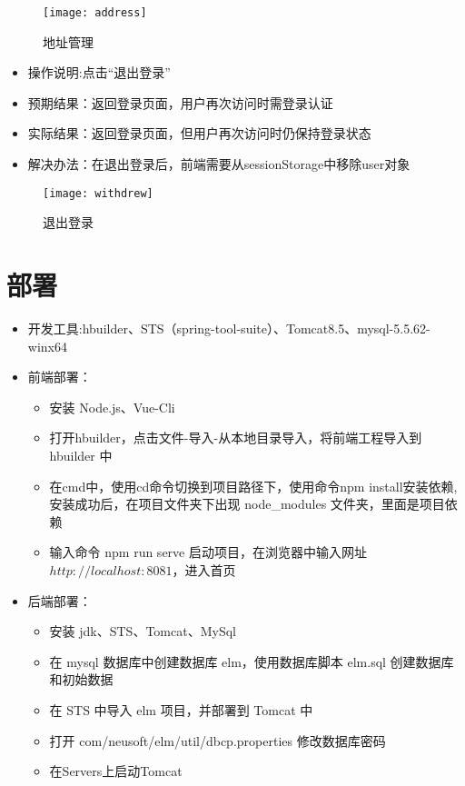 \begin{enumerate}
\begin{itemize}
          \end{itemize}
          \begin{figure}[htbp]
              \centering
              \texttt{[image: address]}
              \caption{地址管理}\label{fig:address}
          \end{figure}
          \begin{itemize}
              \item{操作说明}:点击“退出登录”
              \item {预期结果}：返回登录页面，用户再次访问时需登录认证
              \item {实际结果}：返回登录页面，但用户再次访问时仍保持登录状态
              \item {解决办法}：在退出登录后，前端需要从sessionStorage中移除user对象
          \end{itemize}
          \begin{figure}[htbp]
              \centering
              \texttt{[image: withdrew]}
              \caption{退出登录}\label{fig:withdrew}
          \end{figure}

\end{enumerate}

\section{部署}
\begin{itemize}
    \item{开发工具}:hbuilder、STS（spring-tool-suite）、Tomcat8.5、mysql-5.5.62-winx64
    \item {前端部署}：
          \begin{itemize}
              \item 安装 Node.js、Vue-Cli
              \item 打开hbuilder，点击文件-导入-从本地目录导入，将前端工程导入到 hbuilder 中
              \item 在cmd中，使用cd命令切换到项目路径下，使用命令npm install安装依赖, 安装成功后，在项目文件夹下出现 node\_modules 文件夹，里面是项目依赖
              \item 输入命令 npm run serve 启动项目，在浏览器中输入网址 $http://localhost:8081$，进入首页
          \end{itemize}
    \item {后端部署}：
          \begin{itemize}
              \item 安装 jdk、STS、Tomcat、MySql
              \item 在 mysql 数据库中创建数据库 elm，使用数据库脚本 elm.sql 创建数据库和初始数据
              \item 在 STS 中导入 elm 项目，并部署到 Tomcat 中
              \item 打开 com/neusoft/elm/util/dbcp.properties 修改数据库密码
              \item 在Servers上启动Tomcat
          \end{itemize}
\end{itemize}

